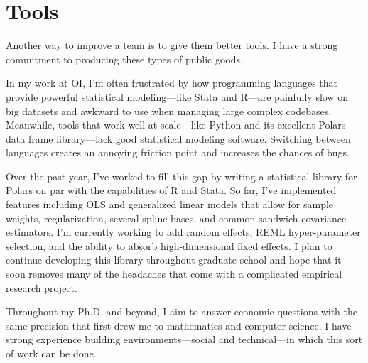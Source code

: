 \documentclass{grad-statement}
\begin{document}
{	\section{Tools}

	Another way to improve a team is to give them better tools.
	I have a strong commitment to producing these types of public goods.

	In my work at OI, I'm often frustrated by how programming languages that provide powerful statistical modeling---like Stata and R---are painfully slow on big datasets and awkward to use when managing large complex codebases.
	Meanwhile, tools that work well at scale---like Python and its excellent Polars data frame library---lack good statistical modeling software.
	Switching between languages creates an annoying friction point and increases the chances of bugs.

	Over the past year, I've worked to fill this gap by writing a statistical library for Polars on par with the capabilities of R and Stata.
	So far, I've implemented features including OLS and generalized linear models that allow for sample weights, regularization, several spline bases, and common sandwich covariance estimators.
	I'm currently working to add random effects, REML hyper-parameter selection, and the ability to absorb high-dimensional fixed effects.
	I plan to continue developing this library throughout graduate school and hope that it soon removes many of the headaches that come with a complicated empirical research project.

	\bigskip

	Throughout my Ph.D. and beyond, I aim to answer economic questions with the same precision that first drew me to mathematics and computer science.
	I have strong experience building environments---social and technical---in which this sort of work can be done.
}{}
\end{document}
